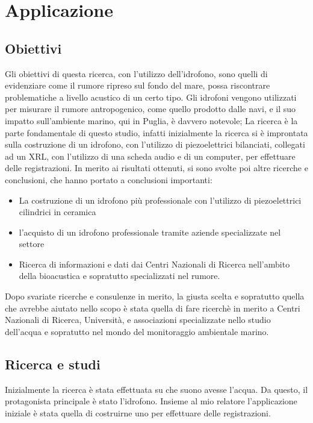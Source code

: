 
\chapter{Applicazione}

\section{Obiettivi}
Gli obiettivi di questa ricerca, con l’utilizzo dell’idrofono, sono quelli di evidenziare come il rumore ripreso sul fondo del mare, possa riscontrare problematiche a livello acustico di un certo tipo.
Gli idrofoni vengono utilizzati per misurare il rumore antropogenico, come quello prodotto dalle navi, e il suo impatto sull'ambiente marino, qui in Puglia, è davvero notevole;
La ricerca è la parte fondamentale di questo studio, infatti inizialmente la ricerca si è improntata sulla costruzione di un idrofono, con l'utilizzo di piezoelettrici bilanciati, collegati ad un XRL, con l'utilizzo di una scheda audio e di un computer, per effettuare delle registrazioni. 
In merito ai risultati ottenuti, si sono svolte poi altre ricerche e conclusioni, che hanno portato a conclusioni importanti: 

\begin{itemize}
\item La costruzione di un idrofono più professionale con l'utilizzo di piezoelettrici cilindrici in ceramica
\item l'acquisto di un idrofono professionale tramite aziende specializzate nel settore
\item Ricerca di informazioni e dati dai Centri Nazionali di Ricerca nell'ambito della bioacustica e sopratutto specializzati nel rumore. 
\end{itemize}

Dopo svariate ricerche e consulenze in merito, la giusta scelta e sopratutto quella che avrebbe aiutato nello scopo è stata quella di fare ricerchè in merito a Centri Nazionali di Ricerca, Università, e associazioni specializzate nello studio dell'acqua e sopratutto nel mondo del monitoraggio ambientale marino. 

\section{Ricerca e studi}
Inizialmente la ricerca è stata effettuata su che suono avesse l'acqua. Da questo, il protagonista principale è stato l'idrofono. 
Insieme al mio relatore l'applicazione iniziale è stata quella di costruirne uno per effettuare delle registrazioni.

